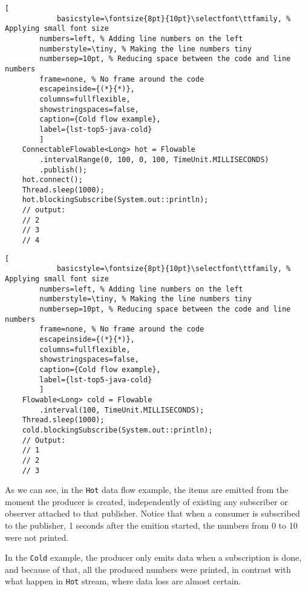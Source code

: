 	\begin{center}
		\begin{minipage}[t]{.49\textwidth}
		\begin{lstlisting}[
			basicstyle=\fontsize{8pt}{10pt}\selectfont\ttfamily, % Applying small font size
        numbers=left, % Adding line numbers on the left
        numberstyle=\tiny, % Making the line numbers tiny
        numbersep=10pt, % Reducing space between the code and line numbers
        frame=none, % No frame around the code
        escapeinside={(*}{*)},
        columns=fullflexible,
        showstringspaces=false,
        caption={Cold flow example},
        label={lst-top5-java-cold}
		]
	ConnectableFlowable<Long> hot = Flowable
		.intervalRange(0, 100, 0, 100, TimeUnit.MILLISECONDS)
		.publish();
	hot.connect(); 
	Thread.sleep(1000);
	hot.blockingSubscribe(System.out::println);
	// output:
	// 2
	// 3
	// 4
		\end{lstlisting}
		\end{minipage}
		\hfill
		\begin{minipage}[t]{.49\textwidth}
		\begin{lstlisting}[
			basicstyle=\fontsize{8pt}{10pt}\selectfont\ttfamily, % Applying small font size
        numbers=left, % Adding line numbers on the left
        numberstyle=\tiny, % Making the line numbers tiny
        numbersep=10pt, % Reducing space between the code and line numbers
        frame=none, % No frame around the code
        escapeinside={(*}{*)},
        columns=fullflexible,
        showstringspaces=false,
        caption={Cold flow example},
        label={lst-top5-java-cold}
		]
	Flowable<Long> cold = Flowable
		.interval(100, TimeUnit.MILLISECONDS);
	Thread.sleep(1000);
	cold.blockingSubscribe(System.out::println);
	// Output:
	// 1
	// 2
	// 3
		\end{lstlisting}
		\end{minipage}
	\end{center}
	

	As we can see, in the \texttt{Hot} data flow example, the items are emitted from the moment the producer is created, independently of existing any subscriber or observer attached to that publisher. Notice that when a consumer is subscribed to the publisher, 1 seconds after the emition started, the numbers from 0 to 10 were not printed.
	
	In the \texttt{Cold} example, the producer only emits data when a subscription is done, and because of that, all the produced numbers were printed, in contrast with what happen in \texttt{Hot} stream, where data loss are almost certain. 
	\clearpage
